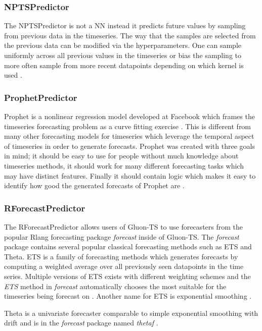 \subsubsection{NPTSPredictor}
The NPTSPredictor is not a NN instead it predicts future values by sampling from previous data in the timeseries. The way that the samples are selected from the previous data can be modified via the hyperparameters. One can sample uniformly across all previous values in the timeseries or bias the sampling to more often sample from more recent datapoints depending on which kernel is used \cite{gluonts-website}.

\subsubsection{ProphetPredictor}
Prophet is a nonlinear regression model developed at Facebook which frames the timeseries forecasting problem as a curve fitting exercise \cite{hyndman_forecasting_3rd}. This is different from many other forecasting models for timeseries which leverage the temporal aspect of timeseries in order to generate forecasts. Prophet was created with three goals in mind; it should be easy to use for people without much knowledge about timeseries methods, it should work for many different forecasting tasks which may have distinct features. Finally it should contain logic which makes it easy to identify how good the generated forecasts of Prophet are \cite{taylor_forecasting_2017}.

\subsubsection{RForecastPredictor}
The RForecastPredictor allows users of Gluon-TS to use forecasters from the popular Rlang forecasting package \textit{forecast} inside of Gluon-TS. The \textit{forecast} package contains several popular classical forecasting methods such as ETS and Theta. ETS is a family of forecasting methods which generates forecasts by computing a weighted average over all previously seen datapoints in the time series. Multiple versions of ETS exists with different weighting schemes and the \textit{ETS} method in \textit{forecast} automatically chooses the most suitable for the timeseries being forecast on \cite{r-forecast-package}. Another name for ETS is exponential smoothing \cite{hyndman_forecasting_3rd}.

Theta is a univariate forecaster comparable to simple exponential smoothing with drift and is in the \textit{forecast} package named \textit{thetaf} \cite{hyndman2003unmasking}.

